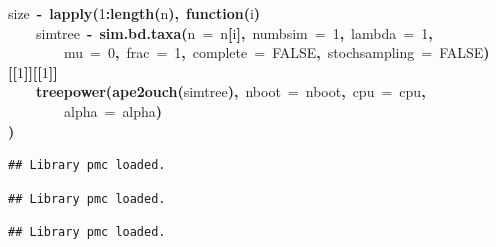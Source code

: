 \documentclass{elsarticle}
\makeatletter
\newcommand{\hlnumber}[1]{\textcolor[rgb]{0,0,0}{#1}}%
\newcommand{\hlfunctioncall}[1]{\textcolor[rgb]{.5,0,.33}{\textbf{#1}}}%
\newcommand{\hlkeyword}[1]{\textbf{#1}}%
\newcommand{\hlargument}[1]{\textcolor[rgb]{.69,.25,.02}{#1}}%
\newcommand{\hlformalargs}[1]{\hlargument{#1}}%
\newcommand{\hlassignement}[1]{\textbf{#1}}%
\newcommand{\hlsymbol}[1]{#1}%
\newcommand{\hlstd}[1]{\textcolor[rgb]{0,0,0}{#1}}%
\newenvironment{kframe}{%
 \def\FrameCommand##1{\hskip\@totalleftmargin \hskip-\fboxsep
 \colorbox{shadecolor}{##1}\hskip-\fboxsep
     \hskip-\linewidth \hskip-\@totalleftmargin \hskip\columnwidth}%
 \MakeFramed {\advance\hsize-\width
   \@totalleftmargin\z@ \linewidth\hsize
   \@setminipage}}%
 {\par\unskip\endMakeFramed}
\newenvironment{knitrout}{}{} %
\makeatother
\begin{document}
\begin{knitrout}
{\begin{kframe}
\begin{flushleft}
\hlstd{}\hlsymbol{size}{\ }\hlassignement{\usebox{\hlnormalsizeboxlessthan}-}{\ }\hlfunctioncall{lapply}\hlkeyword{(}\hlnumber{1}\hlkeyword{:}\hlfunctioncall{length}\hlkeyword{(}\hlsymbol{n}\hlkeyword{)}\hlkeyword{,}{\ }\hlkeyword{function}\hlkeyword{(}\hlformalargs{i}\hlkeyword{)}{\ }\hlkeyword{\usebox{\hlnormalsizeboxopenbrace}}\hspace*{\fill}\\
\hlstd{}{\ }{\ }{\ }{\ }\hlsymbol{simtree}{\ }\hlassignement{\usebox{\hlnormalsizeboxlessthan}-}{\ }\hlfunctioncall{sim.bd.taxa}\hlkeyword{(}\hlargument{n}{\ }\hlargument{=}{\ }\hlsymbol{n}\hlkeyword{[}\hlsymbol{i}\hlkeyword{]}\hlkeyword{,}{\ }\hlargument{numbsim}{\ }\hlargument{=}{\ }\hlnumber{1}\hlkeyword{,}{\ }\hlargument{lambda}{\ }\hlargument{=}{\ }\hlnumber{1}\hlkeyword{,}\hspace*{\fill}\\
\hlstd{}{\ }{\ }{\ }{\ }{\ }{\ }{\ }{\ }\hlargument{mu}{\ }\hlargument{=}{\ }\hlnumber{0}\hlkeyword{,}{\ }\hlargument{frac}{\ }\hlargument{=}{\ }\hlnumber{1}\hlkeyword{,}{\ }\hlargument{complete}{\ }\hlargument{=}{\ }\hlnumber{FALSE}\hlkeyword{,}{\ }\hlargument{stochsampling}{\ }\hlargument{=}{\ }\hlnumber{FALSE}\hlkeyword{)}\hlkeyword{[[}\hlnumber{1}\hlkeyword{]}\hlkeyword{]}\hlkeyword{[[}\hlnumber{1}\hlkeyword{]}\hlkeyword{]}\hspace*{\fill}\\
\hlstd{}{\ }{\ }{\ }{\ }\hlfunctioncall{treepower}\hlkeyword{(}\hlfunctioncall{ape2ouch}\hlkeyword{(}\hlsymbol{simtree}\hlkeyword{)}\hlkeyword{,}{\ }\hlargument{nboot}{\ }\hlargument{=}{\ }\hlsymbol{nboot}\hlkeyword{,}{\ }\hlargument{cpu}{\ }\hlargument{=}{\ }\hlsymbol{cpu}\hlkeyword{,}\hspace*{\fill}\\
\hlstd{}{\ }{\ }{\ }{\ }{\ }{\ }{\ }{\ }\hlargument{alpha}{\ }\hlargument{=}{\ }\hlsymbol{alpha}\hlkeyword{)}\hspace*{\fill}\\
\hlstd{}\hlkeyword{\usebox{\hlnormalsizeboxclosebrace}}\hlkeyword{)}\mbox{}
\normalfont
\end{flushleft}
\begin{verbatim}
## Library pmc loaded.
\end{verbatim}
\begin{verbatim}
## Library pmc loaded.
\end{verbatim}
\begin{verbatim}
## Library pmc loaded.
\end{verbatim}
\begin{verbatim}

\end{verbatim}
\end{kframe}}
\end{knitrout}
\end{document}
